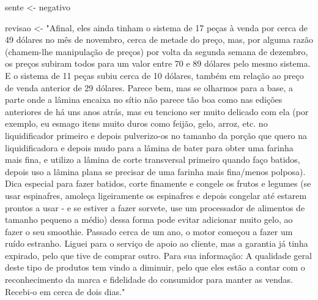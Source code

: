 \documentclass[
  letterpaper,
  paper=6in:9in,
  pagesize=pdftex,
  headinclude=on,
  footinclude=on,
  12pt]{scrbook}
\newenvironment{Shaded}{\begin{snugshade}}{\end{snugshade}}
\newcommand{\NormalTok}[1]{\textcolor[rgb]{0.00,0.23,0.31}{#1}}
\newcommand{\OtherTok}[1]{\textcolor[rgb]{0.00,0.23,0.31}{#1}}
\newcommand{\StringTok}[1]{\textcolor[rgb]{0.13,0.47,0.30}{#1}}
\begin{document}
\begin{Shaded}
\begin{Highlighting}[]
\NormalTok{sente }\OtherTok{\textless{}{-}} \StringTok{\textquotesingle{}negativo\textquotesingle{}}

\NormalTok{revisao }\OtherTok{\textless{}{-}} \StringTok{"Afinal, eles ainda tinham o sistema de 17 peças à }
\StringTok{venda por cerca de 49 dólares no mês de novembro, cerca de metade do preço, }
\StringTok{mas, por alguma razão (chamem{-}lhe manipulação de preços) por volta da segunda semana de dezembro, }
\StringTok{os preços subiram todos para um valor entre 70 e 89 dólares pelo mesmo sistema. }
\StringTok{E o sistema de 11 peças subiu cerca de 10 dólares, também em relação ao preço de venda anterior de 29 dólares.}
\StringTok{Parece bem, mas se olharmos para a base, a parte onde a lâmina encaixa no sítio não parece tão boa}
\StringTok{como nas edições anteriores de há uns anos atrás, mas eu tenciono ser muito delicado com ela }
\StringTok{(por exemplo, eu esmago itens muito duros como feijão, gelo, arroz, etc. no liquidificador primeiro e depois pulverizo{-}os no tamanho da porção que quero na liquidificadora }
\StringTok{e depois mudo para a lâmina de bater para obter uma farinha mais fina, }
\StringTok{e utilizo a lâmina de corte transversal primeiro quando faço batidos, }
\StringTok{depois uso a lâmina plana se precisar de uma farinha mais fina/menos polposa). }
\StringTok{Dica especial para fazer batidos, corte finamente e congele os frutos e legumes }
\StringTok{(se usar espinafres, amoleça ligeiramente os espinafres e depois congelar até estarem prontos a usar }
\StringTok{{-} e se estiver a fazer sorvete, use um processador de alimentos de tamanho pequeno a médio) }
\StringTok{dessa forma pode evitar adicionar muito gelo, ao fazer o seu smoothie. }
\StringTok{Passado cerca de um ano, o motor começou a fazer um ruído estranho. }
\StringTok{Liguei para o serviço de apoio ao cliente, mas a garantia já tinha expirado, }
\StringTok{pelo que tive de comprar outro. Para sua informação: }
\StringTok{A qualidade geral deste tipo de produtos tem vindo a diminuir, pelo que }
\StringTok{eles estão a contar com o reconhecimento da marca e }
\StringTok{fidelidade do consumidor para manter as vendas. }
\StringTok{Recebi{-}o em cerca de dois dias."} 


\end{Highlighting}
\end{Shaded}
\end{document}
